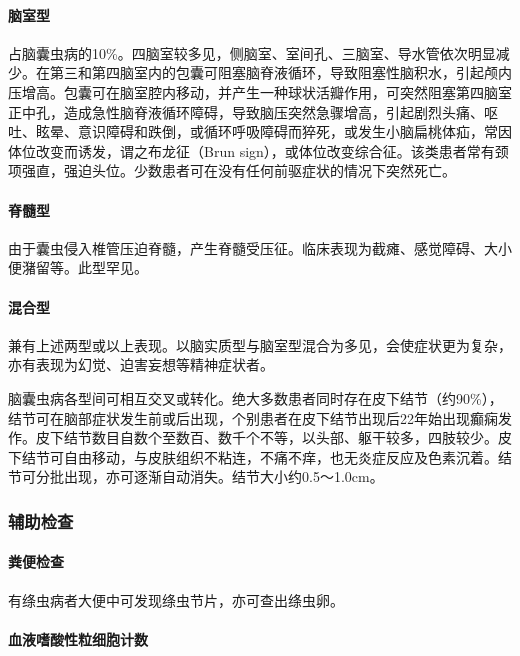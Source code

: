 \paragraph{脑室型}

占脑囊虫病的10\%。四脑室较多见，侧脑室、室间孔、三脑室、导水管依次明显减少。在第三和第四脑室内的包囊可阻塞脑脊液循环，导致阻塞性脑积水，引起颅内压增高。包囊可在脑室腔内移动，并产生一种球状活瓣作用，可突然阻塞第四脑室正中孔，造成急性脑脊液循环障碍，导致脑压突然急骤增高，引起剧烈头痛、呕吐、眩晕、意识障碍和跌倒，或循环呼吸障碍而猝死，或发生小脑扁桃体疝，常因体位改变而诱发，谓之布龙征（Brun
sign），或体位改变综合征。该类患者常有颈项强直，强迫头位。少数患者可在没有任何前驱症状的情况下突然死亡。

\paragraph{脊髓型}

由于囊虫侵入椎管压迫脊髓，产生脊髓受压征。临床表现为截瘫、感觉障碍、大小便潴留等。此型罕见。

\paragraph{混合型}

兼有上述两型或以上表现。以脑实质型与脑室型混合为多见，会使症状更为复杂，亦有表现为幻觉、迫害妄想等精神症状者。

脑囊虫病各型间可相互交叉或转化。绝大多数患者同时存在皮下结节（约90\%），结节可在脑部症状发生前或后出现，个别患者在皮下结节出现后22年始出现癫痫发作。皮下结节数目自数个至数百、数千个不等，以头部、躯干较多，四肢较少。皮下结节可自由移动，与皮肤组织不粘连，不痛不痒，也无炎症反应及色素沉着。结节可分批出现，亦可逐渐自动消失。结节大小约0.5～1.0cm。

\subsubsection{辅助检查}

\paragraph{粪便检查}

有绦虫病者大便中可发现绦虫节片，亦可查出绦虫卵。

\paragraph{血液嗜酸性粒细胞计数}

